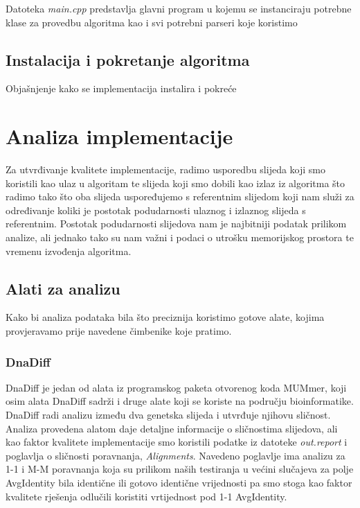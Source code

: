 \documentclass[times, utf8, seminar, numeric]{fer}
\begin{document}
Datoteka \emph{main.cpp} predstavlja glavni program u kojemu se instanciraju potrebne klase za provedbu algoritma kao i svi potrebni parseri koje koristimo 

\section{Instalacija i pokretanje algoritma}
Objašnjenje kako se implementacija instalira i pokreće


\chapter{Analiza implementacije}
Za utvrđivanje kvalitete implementacije, radimo usporedbu slijeda koji smo koristili kao ulaz u algoritam te slijeda koji smo dobili kao izlaz iz algoritma što radimo tako što oba slijeda uspoređujemo s referentnim slijedom koji nam služi za određivanje koliki je postotak podudarnosti ulaznog i izlaznog slijeda s referentnim. Postotak podudarnosti slijedova nam je najbitniji podatak prilikom analize, ali jednako tako su nam važni i podaci o utrošku memorijskog prostora te vremenu izvođenja algoritma.


\section{Alati za analizu}
Kako bi analiza podataka bila što preciznija koristimo gotove alate, kojima provjeravamo prije navedene čimbenike koje pratimo.

\subsection{DnaDiff}
DnaDiff je jedan od alata iz programskog paketa otvorenog koda MUMmer, koji osim alata DnaDiff sadrži i druge alate koji se koriste na području bioinformatike. DnaDiff radi analizu između dva genetska slijeda i utvrđuje njihovu sličnost. Analiza provedena alatom daje detaljne informacije o sličnostima slijedova, ali kao faktor kvalitete implementacije smo koristili podatke iz datoteke \emph{out.report} i poglavlja o sličnosti poravnanja, \emph{Alignments}. Navedeno poglavlje ima analizu za 1-1 i M-M poravnanja koja su prilikom naših testiranja u većini slučajeva za polje AvgIdentity bila identične ili gotovo identične vrijednosti pa smo stoga kao faktor kvalitete rješenja odlučili koristiti vrtijednost pod 1-1 AvgIdentity.
\end{document}
